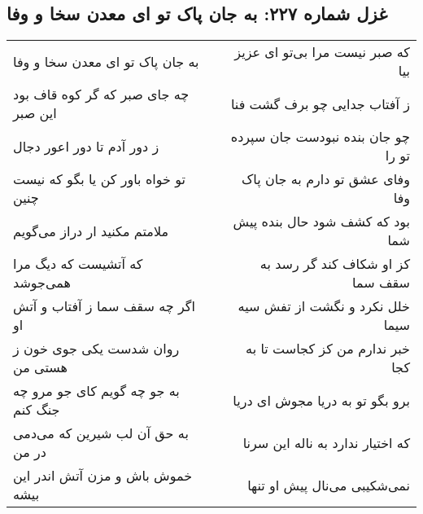 \begin{center}
\section*{غزل شماره ۲۲۷: به جان پاک تو ای معدن سخا و وفا}
\label{sec:0227}
\begin{longtable}{l p{0.5cm} r}
به جان پاک تو ای معدن سخا و وفا
&&
که صبر نیست مرا بی‌تو ای عزیز بیا
\\
چه جای صبر که گر کوه قاف بود این صبر
&&
ز آفتاب جدایی چو برف گشت فنا
\\
ز دور آدم تا دور اعور دجال
&&
چو جان بنده نبودست جان سپرده تو را
\\
تو خواه باور کن یا بگو که نیست چنین
&&
وفای عشق تو دارم به جان پاک وفا
\\
ملامتم مکنید ار دراز می‌گویم
&&
بود که کشف شود حال بنده پیش شما
\\
که آتشیست که دیگ مرا همی‌جوشد
&&
کز او شکاف کند گر رسد به سقف سما
\\
اگر چه سقف سما ز آفتاب و آتش او
&&
خلل نکرد و نگشت از تفش سیه سیما
\\
روان شدست یکی جوی خون ز هستی من
&&
خبر ندارم من کز کجاست تا به کجا
\\
به جو چه گویم کای جو مرو چه جنگ کنم
&&
برو بگو تو به دریا مجوش ای دریا
\\
به حق آن لب شیرین که می‌دمی در من
&&
که اختیار ندارد به ناله این سرنا
\\
خموش باش و مزن آتش اندر این بیشه
&&
نمی‌شکیبی می‌نال پیش او تنها
\\
\end{longtable}
\end{center}
